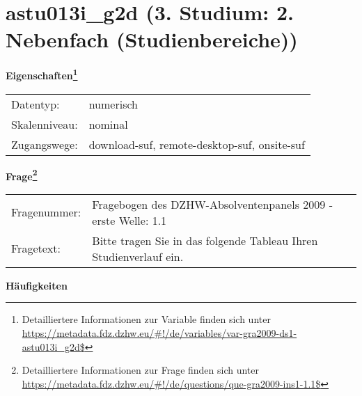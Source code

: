 
    \setcounter{footnote}{0}

    \vspace*{-1.8cm}
	\section{astu013i\_g2d (3. Studium: 2. Nebenfach (Studienbereiche))}
	\label{section:astu013i_g2d}



    \vspace*{0.5cm}
    \noindent\textbf{Eigenschaften\footnote{Detailliertere Informationen zur Variable finden sich unter
		\url{https://metadata.fdz.dzhw.eu/\#!/de/variables/var-gra2009-ds1-astu013i_g2d$}}}\\
	\begin{tabularx}{\hsize}{@{}lX}
	Datentyp: & numerisch \\
	Skalenniveau: & nominal \\
	Zugangswege: &
	  download-suf, 
	  remote-desktop-suf, 
	  onsite-suf
 \\
    \end{tabularx}



				\vspace*{0.5cm}
                \noindent\textbf{Frage\footnote{Detailliertere Informationen zur Frage finden sich unter
		              \url{https://metadata.fdz.dzhw.eu/\#!/de/questions/que-gra2009-ins1-1.1$}}}\\
				\begin{tabularx}{\hsize}{@{}lX}
					Fragenummer: &
					  Fragebogen des DZHW-Absolventenpanels 2009 - erste Welle:
					  1.1
 \\
					Fragetext: & Bitte tragen Sie in das folgende Tableau Ihren Studienverlauf ein. \\
				\end{tabularx}





        		\vspace*{0.5cm}
                \noindent\textbf{Häufigkeiten}

